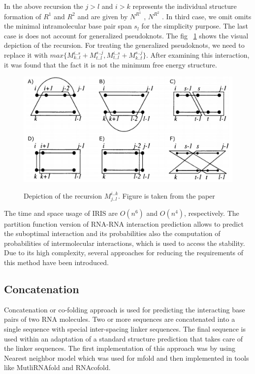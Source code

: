 \documentclass[twoside,a4paper]{report}
\begin{document}
	In the above recursion the $j > l $  and $ i > k $ represents the individual structure formation of $R^1$ and $R^2$ and are given by $N^{R^1}$ , $N^{R^2}$ . In third case, we omit omits the minimal intramolecular base pair span $s_l$ for the simplicity purpose. The last case is does not account for generalized pseudoknots. The fig ~\ref{fig:iris} shows the visual depiction of the recursion. For treating the generalized pseudoknots, we need to replace it with $max \{ M^{i..s}_{k..t} + 	M^{s..j}_{t..l} , M^{i..s}_{t..l} + 	M^{s..j}_{k..t}\}$. After examining this interaction, it was found that the fact it is not the minimum free energy structure.\\
	
	\begin{figure}[H]
		\includegraphics[width=1.0\linewidth]{iris}
		\centering
		\caption{ Depiction of the recursion $M^{i..k}_{j..l}$. Figure is taken from the paper} 
		\citep{wright2018structure}
		\label{fig:iris}
	\end{figure}
	

	The time and space usage of IRIS are $ O(n^6)$ and $ O(n^4)$, respectively. The partition function version of RNA-RNA interaction prediction allows to predict the suboptimal interaction and its probabilities also the computation of probabilities of intermolecular interactions, which is used to access the stability. Due to its high complexity, several approaches for reducing the requirements of this method have been introduced.\\
	
	 
	\subsection{Concatenation}
	Concatenation or co-folding approach is used for predicting the interacting base pairs of two RNA molecules. Two or more sequences are concatenated  into a single sequence with special inter-spacing linker sequences. The final sequence is used within an adaptation of a standard structure prediction that takes  care of the linker sequences. The first implementation of this approach was by using Nearest neighbor model which was used for mfold and then implemented in tools like MutliRNAfold and RNAcofold.\\
	
\end{document}
